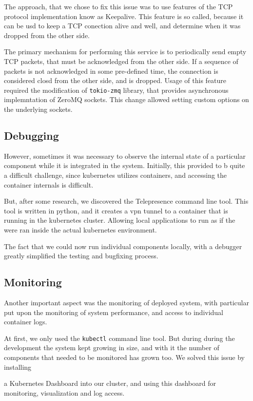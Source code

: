 The approach, that we chose to fix this issue was to use features of the TCP protocol implementation know as Keepalive.
This feature is so called, because it can be usd to keep a TCP conection alive and well, and determine when it was dropped from the other side.

The primary mechanism for performing this service is to periodically send empty TCP packets, that must be acknowledged from
the other side. If a sequence of packets is not acknowledged in some pre-defined time, the connection is considered closd
from the other side, and is dropped. Usage of this feature required the modification of \verb|tokio-zmq| library, that provides asynchronous implemntation
of ZeroMQ sockets. This change allowed setting custom options on the underlying sockets.


\subsection{Debugging}
However, sometimes it was necessary to observe the internal state of a particular component while it is integrated in the system.
Initially, this provided to b quite a difficult challenge, since kubernetes utilizes containers, and accessing the container
internals is difficult.

But, after some research, we discovered the Telepresence command line tool. This tool is written in python,
and it creates a vpn tunnel to a container that is running in the kubernetes cluster. Allowing local applications to run as if
the were ran inside the actual kubernetes environment.

The fact that we could now run individual components locally, with a debugger greatly simplified the testing and bugfixing process.

\subsection{Monitoring}
Another important aspect was the monitoring of deployed system, with particular  put upon
the monitoring of system performance, and access to individual container logs.

At first, we only used the \verb|kubectl| command line tool. But during during the development the system kept growing
in size, and with it the number of components that needed to be monitored has grown too. We solved this issue by installing

a Kubernetes Dashboard into our cluster, and using this dashboard for monitoring, visualization and log access.

